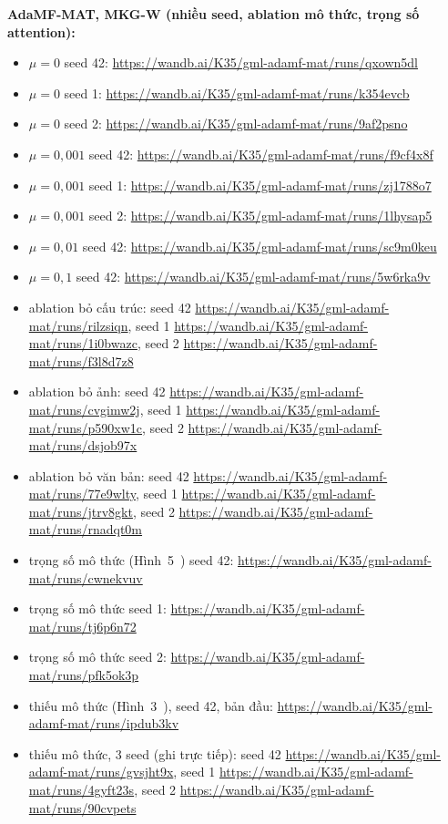 \par\smallskip\noindent\textbf{AdaMF-MAT, MKG-W (nhiều seed, ablation mô thức, trọng số attention):}
\begin{itemize}\itemsep0pt\parskip0pt
  \item $\mu{=}0$ seed 42: \url{https://wandb.ai/K35/gml-adamf-mat/runs/qxown5dl}
  \item $\mu{=}0$ seed 1: \url{https://wandb.ai/K35/gml-adamf-mat/runs/k354evcb}
  \item $\mu{=}0$ seed 2: \url{https://wandb.ai/K35/gml-adamf-mat/runs/9af2psno}
  \item $\mu{=}0{,}001$ seed 42: \url{https://wandb.ai/K35/gml-adamf-mat/runs/f9cf4x8f}
  \item $\mu{=}0{,}001$ seed 1: \url{https://wandb.ai/K35/gml-adamf-mat/runs/zj1788o7}
  \item $\mu{=}0{,}001$ seed 2: \url{https://wandb.ai/K35/gml-adamf-mat/runs/1lhysap5}
  \item $\mu{=}0{,}01$ seed 42: \url{https://wandb.ai/K35/gml-adamf-mat/runs/sc9m0keu}
  \item $\mu{=}0{,}1$ seed 42: \url{https://wandb.ai/K35/gml-adamf-mat/runs/5w6rka9v}
  \item ablation bỏ cấu trúc: seed 42 \url{https://wandb.ai/K35/gml-adamf-mat/runs/rilzsiqn}, seed 1 \url{https://wandb.ai/K35/gml-adamf-mat/runs/1i0bwazc}, seed 2 \url{https://wandb.ai/K35/gml-adamf-mat/runs/f3l8d7z8}
  \item ablation bỏ ảnh: seed 42 \url{https://wandb.ai/K35/gml-adamf-mat/runs/cvgimw2j}, seed 1 \url{https://wandb.ai/K35/gml-adamf-mat/runs/p590xw1c}, seed 2 \url{https://wandb.ai/K35/gml-adamf-mat/runs/dsjob97x}
  \item ablation bỏ văn bản: seed 42 \url{https://wandb.ai/K35/gml-adamf-mat/runs/77e9wlty}, seed 1 \url{https://wandb.ai/K35/gml-adamf-mat/runs/jtrv8gkt}, seed 2 \url{https://wandb.ai/K35/gml-adamf-mat/runs/rnadqt0m}
  \item trọng số mô thức (Hình~5~\cite{adamfmat}) seed 42: \url{https://wandb.ai/K35/gml-adamf-mat/runs/cwnekvuv}
  \item trọng số mô thức seed 1: \url{https://wandb.ai/K35/gml-adamf-mat/runs/tj6p6n72}
  \item trọng số mô thức seed 2: \url{https://wandb.ai/K35/gml-adamf-mat/runs/pfk5ok3p}
  \item thiếu mô thức (Hình~3~\cite{adamfmat}), seed 42, bản đầu: \url{https://wandb.ai/K35/gml-adamf-mat/runs/ipdub3kv}
  \item thiếu mô thức, 3 seed (ghi trực tiếp): seed 42 \url{https://wandb.ai/K35/gml-adamf-mat/runs/gvsjht9x}, seed 1 \url{https://wandb.ai/K35/gml-adamf-mat/runs/4gyft23s}, seed 2 \url{https://wandb.ai/K35/gml-adamf-mat/runs/90cvpets}
\end{itemize}

